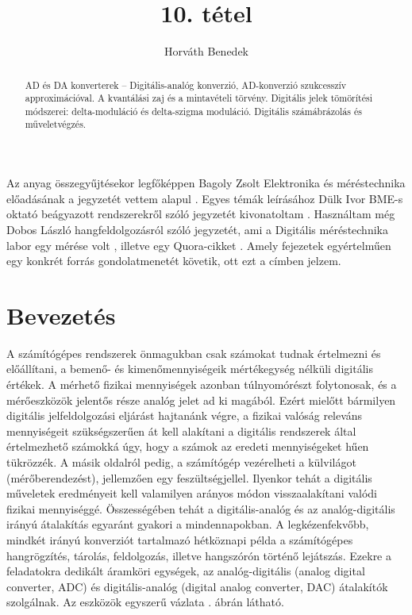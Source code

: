 \documentclass[12pt]{article}
\theoremstyle{plain}
\begin{document}
\title{10. tétel}
\author{Horváth Benedek}

\maketitle


\newpage
\begin{abstract}
    AD és DA konverterek – Digitális-analóg konverzió, AD-konverzió szukcesszív approximációval. A kvantálási zaj és a mintavételi törvény. Digitális jelek tömörítési módszerei: delta-moduláció és delta-szigma moduláció. Digitális számábrázolás és műveletvégzés.
\end{abstract}


Az anyag összegyűjtésekor legfőképpen Bagoly Zsolt Elektronika és méréstechnika előadásának a jegyzetét vettem alapul \cite{Bagoly}. Egyes témák leírásához Dülk Ivor BME-s oktató beágyazott rendszerekről szóló jegyzetét kivonatoltam \cite{BME}. Használtam még Dobos László hangfeldolgozásról szóló jegyzetét, ami a Digitális méréstechnika labor egy mérése volt \cite{hangfeldolgozas}, illetve egy Quora-cikket \cite{quora}. Amely fejezetek egyértelműen egy konkrét forrás gondolatmenetét követik, ott ezt a címben jelzem.


\section{Bevezetés}

A számítógépes rendszerek önmagukban csak számokat tudnak értelmezni és előállítani, a bemenő- és kimenőmennyiségeik mértékegység nélküli digitális értékek. A mérhető fizikai mennyiségek azonban túlnyomórészt folytonosak, és a mérőeszközök jelentős része analóg jelet ad ki magából. Ezért mielőtt bármilyen digitális jelfeldolgozási eljárást hajtanánk végre, a fizikai valóság releváns mennyiségeit szükségszerűen át kell alakítani a digitális rendszerek által értelmezhető számokká úgy, hogy a számok az eredeti mennyiségeket hűen tükrözzék. A másik oldalról pedig, a számítógép vezérelheti a külvilágot (mérőberendezést), jellemzően egy feszültségjellel. Ilyenkor tehát a digitális műveletek eredményeit kell valamilyen arányos módon visszaalakítani valódi fizikai mennyiséggé. Összességében tehát a digitális-analóg és az analóg-digitális irányú átalakítás egyaránt gyakori a mindennapokban. A legkézenfekvőbb, mindkét irányú konverziót tartalmazó hétköznapi példa a számítógépes hangrögzítés, tárolás, feldolgozás, illetve hangszórón történő lejátszás. Ezekre a feladatokra dedikált áramköri egységek, az analóg-digitális (analog digital converter, ADC) és digitális-analóg (digital analog converter, DAC) átalakítók szolgálnak. Az eszközök egyszerű vázlata . ábrán látható. 
\end{document}
